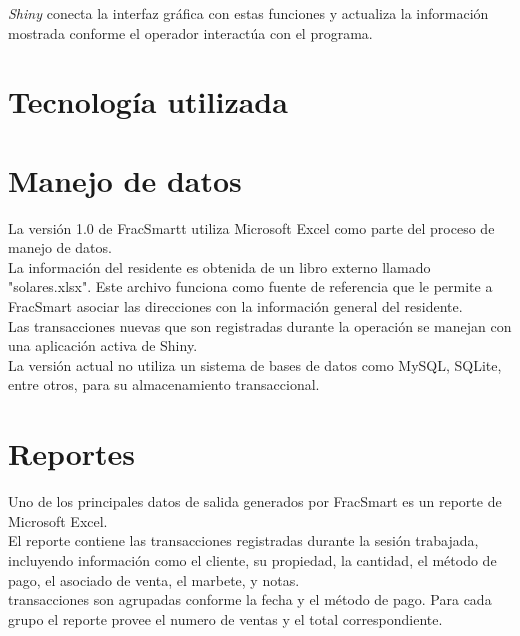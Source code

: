 \documentclass{article}
\begin{document}
\quad\quad \textit{Shiny} conecta la interfaz gráfica con estas funciones y actualiza la información mostrada conforme el operador interactúa con el programa.


\newpage
\section{Tecnología utilizada}
\quad\quad 


\newpage
\section{Manejo de datos}
\quad\quad La versión 1.0 de FracSmartt utiliza Microsoft Excel como parte del proceso de manejo de datos.\\

\quad\quad La información del residente es obtenida de un libro externo llamado "solares.xlsx". Este archivo funciona como fuente de referencia que le permite a FracSmart asociar las direcciones con la información general del residente. \\

\quad\quad Las transacciones nuevas que son registradas durante la operación se manejan con una aplicación activa de Shiny.\\

\quad\quad La versión actual no utiliza un sistema de bases de datos como MySQL, SQLite, entre otros, para su almacenamiento transaccional.


\newpage
\section{Reportes}
\quad\quad Uno de los principales datos de salida generados por FracSmart es un reporte de Microsoft Excel.\\

\quad\quad El reporte contiene las transacciones registradas durante la sesión trabajada, incluyendo información como el cliente, su propiedad, la cantidad, el método de pago, el asociado de venta, el marbete, y notas. \\

\quad\quadLas transacciones son agrupadas conforme la fecha y el método de pago. Para cada grupo el reporte provee el numero de ventas y el total correspondiente.\\
\end{document}
